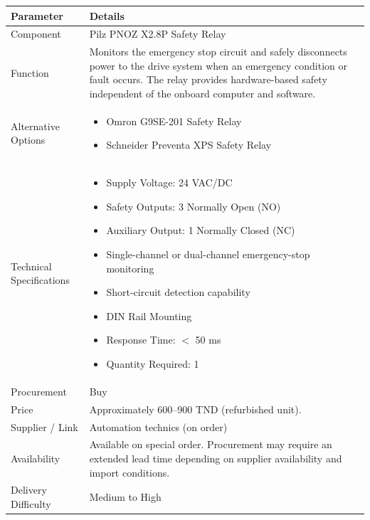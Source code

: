 \documentclass[12pt,a4paper]{article}
\begin{document}
\begin{longtable}{|p{4cm}|p{10cm}|}
\hline

\textbf{Parameter} & \textbf{Details} \\
\hline

Component &
Pilz PNOZ X2.8P Safety Relay \\
\hline

Function &
Monitors the emergency stop circuit and safely disconnects power to the drive system when an emergency condition or fault occurs. The relay provides hardware-based safety independent of the onboard computer and software. \\
\hline


Alternative Options &
\begin{itemize}
\item Omron G9SE-201 Safety Relay
\item Schneider Preventa XPS Safety Relay
\end{itemize}
\\
\hline

Technical Specifications &
\begin{itemize}
\item Supply Voltage: 24 VAC/DC
\item Safety Outputs: 3 Normally Open (NO)
\item Auxiliary Output: 1 Normally Closed (NC)
\item Single-channel or dual-channel emergency-stop monitoring
\item Short-circuit detection capability
\item DIN Rail Mounting
\item Response Time: $<$ 50 ms
\item Quantity Required: 1
\end{itemize}
\\
\hline

Procurement &
Buy \\
\hline

Price &
Approximately 600--900 TND (refurbished unit). \\
\hline

Supplier / Link &
Automation technics (on order)
\\
\hline

Availability &
Available on special order. Procurement may require an extended lead time depending on supplier availability and import conditions. \\
\hline

Delivery Difficulty &
Medium to High \\
\hline


\end{longtable}
\end{document}
